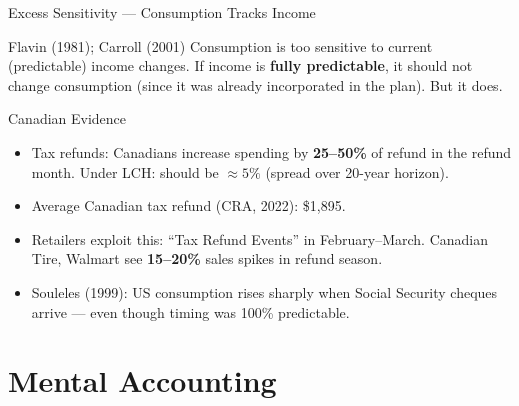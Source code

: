 \documentclass[aspectratio=169]{beamer}
\begin{document}
\begin{frame}{Excess Sensitivity --- Consumption Tracks Income}
\begin{block}{Flavin (1981); Carroll (2001)}
Consumption is too sensitive to current (predictable) income changes. If income is \textbf{fully predictable}, it should not change consumption (since it was already incorporated in the plan). But it does.
\end{block}
\begin{exampleblock}{Canadian Evidence}
\begin{itemize}
  \item Tax refunds: Canadians increase spending by \textbf{25--50\%} of refund in the refund month. Under LCH: should be $\approx 5\%$ (spread over 20-year horizon).
  \item Average Canadian tax refund (CRA, 2022): \$1,895.
  \item Retailers exploit this: ``Tax Refund Events'' in February--March. Canadian Tire, Walmart see \textbf{15--20\%} sales spikes in refund season.
  \item Souleles (1999): US consumption rises sharply when Social Security cheques arrive --- even though timing was 100\% predictable.
\end{itemize}
\end{exampleblock}
\end{frame}

\section{Mental Accounting}
\end{document}
